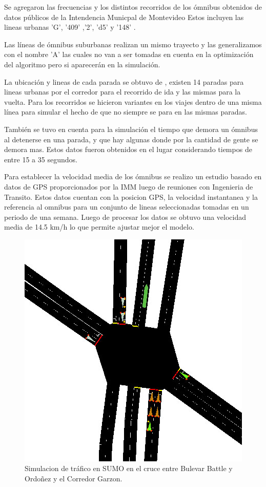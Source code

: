 Se agregaron las frecuencias y los distintos recorridos de los ómnibus obtenidos de datos públicos de la Intendencia Municpal de Montevideo \citep{IMM}
Estos incluyen las lineas urbanas  'G', '409' ,'2', 'd5'  y  '148' . 

Las líneas de ómnibus suburbanas realizan  un mismo  trayecto y las generalizamos con el nombre 'A' las cuales no van a ser tomadas en cuenta en la optimización del algoritmo pero si aparecerán en la simulación.

La ubicación y lineas de cada parada se obtuvo de \citep{sigMontevideo}, existen 14 paradas para lineas urbanas por el corredor para el recorrido de ida y las mismas para la vuelta.
Para los recorridos se hicieron  variantes  en  los  viajes  dentro  de  una  misma línea para simular el hecho de que no siempre se para en las mismas paradas.

También se tuvo en cuenta para la simulación el tiempo que demora un ómnibus al detenerse en una parada, y que hay algunas donde por la cantidad de gente se demora mas. Estos datos fueron obtenidos en el lugar considerando tiempos de entre 15 a 35 segundos.

Para establecer la velocidad media de los ómnibus se realizo un estudio basado en datos de GPS proporcionados por la IMM luego de reuniones con Ingenieria de Transito.
Estos datos cuentan con la posicion GPS, la velocidad instantanea y la referencia al omnibus para un conjunto de lineas seleccionadas tomadas en un periodo de una semana. Luego de procesar los datos se obtuvo una velocidad media de 14.5 km/h lo que permite ajustar mejor el modelo. 



\begin{figure}[h]
	\centering
	\includegraphics[width=0.7\linewidth]{Figures/sim1}
	\caption{Simulacion de tráfico en SUMO en el cruce entre Bulevar Battle y Ordoñez y el Corredor Garzon.}
	\label{fig:sim1}
\end{figure}


